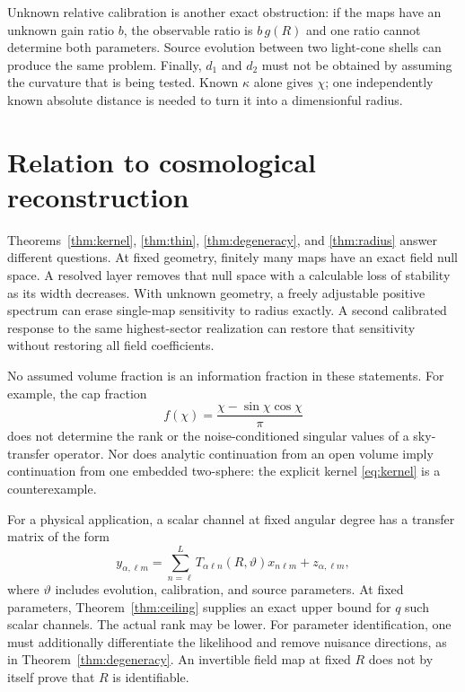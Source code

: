 \documentclass[aps,prd,reprint,amsmath,amssymb,nofootinbib,
longbibliography]{revtex4-2}
\begin{document}
Unknown relative calibration is another exact obstruction: if the maps
have an unknown gain ratio $b$, the observable ratio is $b\,g(R)$ and
one ratio cannot determine both parameters. Source evolution between
two light-cone shells can produce the same problem. Finally, $d_1$ and
$d_2$ must not be obtained by assuming the curvature that is being tested.
Known $\kappa$ alone gives $\chi$; one independently known absolute
distance is needed to turn it into a dimensionful radius.

\section{Relation to cosmological reconstruction}
\label{sec:cosmology}

Theorems~\ref{thm:kernel}, \ref{thm:thin}, \ref{thm:degeneracy}, and
\ref{thm:radius} answer different questions. At fixed geometry, finitely
many maps have an exact field null space. A resolved layer removes that
null space with a calculable loss of stability as its width decreases.
With unknown geometry, a freely adjustable positive spectrum can erase
single-map sensitivity to radius exactly. A second calibrated response
to the same highest-sector realization can restore that sensitivity
without restoring all field coefficients.

No assumed volume fraction is an information fraction in these statements.
For example, the cap fraction
\begin{equation}
 f(\chi)=\frac{\chi-\sin\chi\cos\chi}{\pi}
\end{equation}
does not determine the rank or the noise-conditioned singular values
of a sky-transfer operator. Nor does analytic continuation from an open
volume imply continuation from one embedded two-sphere: the explicit
kernel \eqref{eq:kernel} is a counterexample.

For a physical application, a scalar channel at fixed angular degree
has a transfer matrix of the form
\begin{equation}
 y_{\alpha,\ell m}=\sum_{n=\ell}^L
 T_{\alpha\ell n}(R,\vartheta)x_{n\ell m}+z_{\alpha,\ell m},
 \label{eq:physicalT}
\end{equation}
where $\vartheta$ includes evolution, calibration, and source parameters.
At fixed parameters, Theorem~\ref{thm:ceiling} supplies an exact upper
bound for $q$ such scalar channels. The actual rank may be lower.
For parameter identification, one must additionally differentiate the
likelihood and remove nuisance directions, as in
Theorem~\ref{thm:degeneracy}. An invertible field map at fixed $R$
does not by itself prove that $R$ is identifiable.
\end{document}
